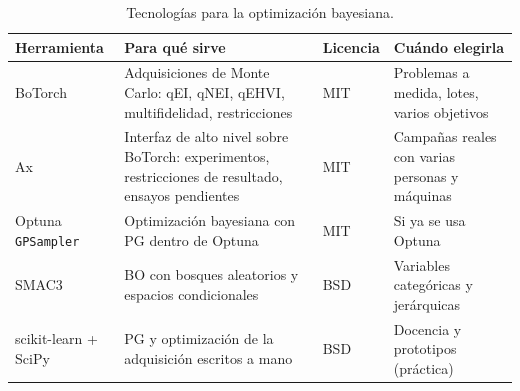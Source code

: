 \begin{table}[ht]
\centering\small
\begin{tabularx}{\textwidth}{@{}>{\raggedright\arraybackslash}p{2.5cm}>{\raggedright\arraybackslash}X>{\raggedright\arraybackslash}p{1.4cm}>{\raggedright\arraybackslash}p{3.8cm}@{}}
\toprule
Herramienta & Para qué sirve & Licencia & Cuándo elegirla \\
\midrule
BoTorch~\cite{botorch} & Adquisiciones de Monte Carlo: qEI, qNEI, qEHVI, multifidelidad, restricciones & MIT & Problemas a medida, lotes, varios objetivos \\
Ax~\cite{ax} & Interfaz de alto nivel sobre BoTorch: experimentos, restricciones de resultado, ensayos pendientes & MIT & Campañas reales con varias personas y máquinas \\
Optuna \texttt{GPSampler}~\cite{optuna} & Optimización bayesiana con PG dentro de Optuna & MIT & Si ya se usa Optuna \\
SMAC3~\cite{smac3} & BO con bosques aleatorios y espacios condicionales & BSD & Variables categóricas y jerárquicas \\
scikit-learn + SciPy & PG y optimización de la adquisición escritos a mano & BSD & Docencia y prototipos (práctica) \\
\bottomrule
\end{tabularx}
\caption{Tecnologías para la optimización bayesiana.}
\label{tab:tec4}
\end{table}

\addtocounter{definicion}{1}%

